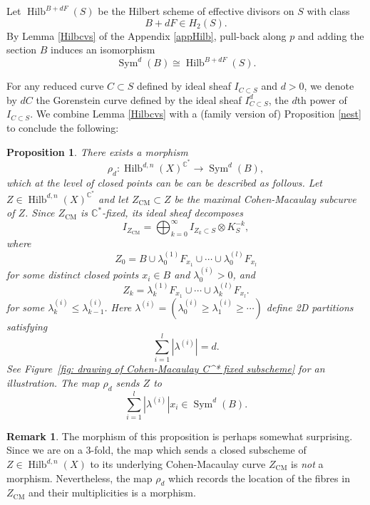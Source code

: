 \documentclass{amsart}
\newtheorem{proposition}[theorem]{Proposition}
\theoremstyle{definition}
\newtheorem{remark}[theorem]{Remark}
\newcommand{\CC} {\mathbb{C}}          %
\newcommand{\Sym}{\operatorname{Sym}}
\newcommand{\Hilb}{\operatorname{Hilb}}
\newcommand{\CM}{\operatorname{CM}}
\begin{document}
Let $\Hilb^{B+dF}(S)$ be the Hilbert scheme of effective divisors on $S$ with class $$B+dF \in H_2(S).$$ By Lemma \ref{Hilbcvs} of the Appendix \ref{appHilb}, pull-back along $p$ and adding the section $B$ induces an isomorphism
$$
\Sym^d(B) \cong \Hilb^{B+dF}(S).
$$

For any reduced curve $C \subset S$ defined by ideal sheaf $I_{C \subset S}$ and $d >0$, we denote by $dC$ the Gorenstein curve defined by the ideal sheaf $I_{C \subset S}^d$, the $d$th power of $I_{C \subset S}$. We combine Lemma \ref{Hilbcvs} with a (family version of) Proposition \ref{nest} to conclude the following:
\begin{proposition} \label{proprho}
There exists a morphism
$$
\rho_d : \Hilb^{d,n}(X)^{\CC^*} \longrightarrow \Sym^d(B), 
$$
which at the level of closed points can be can be described as follows. Let $Z \in \Hilb^{d,n}(X)^{\CC^*}$ and let $Z_{\CM} \subset Z$ be the maximal Cohen-Macaulay subcurve of $Z$. Since $Z_{\CM}$ is $\CC^*$-fixed, its ideal sheaf decomposes
$$
I_{Z_{\CM}} = \bigoplus_{k=0}^{\infty} I_{Z_k \subset S} \otimes K_{S}^{-k},
$$
where 
$$
Z_0 = B \cup \lambda_{0}^{(1)} F_{x_1} \cup \cdots \cup \lambda_{0}^{(l)} F_{x_l}
$$
for some distinct closed points $x_i \in B$ and $\lambda_{0}^{(i)} > 0$, and
$$
Z_k = \lambda_{k}^{(1)} F_{x_1} \cup \cdots \cup \lambda_{k}^{(l)} F_{x_l}.
$$
for some $\lambda_{k}^{(i)} \leq \lambda_{k-1}^{(i)}$. Here $\lambda^{(i)} = (\lambda^{(i)}_{0} \geq \lambda^{(i)}_{1} \geq \cdots)$ define 2D partitions satisfying 
$$
\sum_{i=1}^{l} |\lambda^{(i)}| = d.
$$
See Figure~\ref{fig: drawing of Cohen-Macaulay C^* fixed subscheme}
for an illustration. The map $\rho_d$ sends $Z$ to 
$$
\sum_{i=1}^{l} |\lambda^{(i)}| x_i \in \Sym^d(B).
$$
\end{proposition}

\begin{remark}
The morphism of this proposition is perhaps somewhat surprising. Since we are on a 3-fold, the map which sends a closed subscheme of $Z \in \Hilb^{d,n}(X)$ to its underlying Cohen-Macaulay curve $Z_{\CM}$ is \emph{not} a morphism. Nevertheless, the map $\rho_d$ which records the location of the fibres in $Z_{\CM}$ and their multiplicities is a morphism.
\end{remark}
\end{document}
